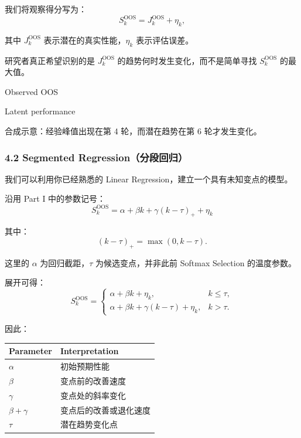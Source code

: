 我们将观察得分写为：
\[S_k^{\mathrm{OOS}}
=
J_k^{\mathrm{OOS}}+\eta_k,\]

其中 \(J_k^{\mathrm{OOS}}\) 表示潜在的真实性能，\(\eta_k\) 表示评估误差。

研究者真正希望识别的是 \(J_k^{\mathrm{OOS}}\) 的趋势何时发生变化，而不是简单寻找 \(S_k^{\mathrm{OOS}}\) 的最大值。


Observed OOS

Latent performance

合成示意：经验峰值出现在第 4 轮，而潜在趋势在第 6 轮才发生变化。

\hypertarget{part-3-48-0001-segmented-regressionux5206ux6bb5ux56deux5f52}{%
\subsubsection{4.2 Segmented Regression（分段回归）}\label{part-3-48-0001-segmented-regressionux5206ux6bb5ux56deux5f52}}

我们可以利用你已经熟悉的 Linear Regression，建立一个具有未知变点的模型。

沿用 Part I 中的参数记号：
\[\boxed{
S_k^{\mathrm{OOS}}
=
\alpha+\beta k
+\gamma(k-\tau)_+
+\eta_k
}\]

其中：
\[(k-\tau)_+=\max(0,k-\tau).\]

这里的 \(\alpha\) 为回归截距，\(\tau\) 为候选变点，并非此前 Softmax Selection 的温度参数。

展开可得：
\[S_k^{\mathrm{OOS}}
=
\begin{cases}
\alpha+\beta k+\eta_k,
&k\leq\tau,\\
\alpha+\beta k+\gamma(k-\tau)+\eta_k,
&k>\tau.
\end{cases}\]

因此：

\begin{readertable}
\begin{longtable}[]{@{}
  >{\raggedright\arraybackslash}p{}
  >{\raggedright\arraybackslash}p{}@{}}
\toprule
Parameter & Interpretation \\
\midrule
\endhead
\(\alpha\) & 初始预期性能 \\
\(\beta\) & 变点前的改善速度 \\
\(\gamma\) & 变点处的斜率变化 \\
\(\beta+\gamma\) & 变点后的改善或退化速度 \\
\(\tau\) & 潜在趋势变化点 \\
\bottomrule
\end{longtable}
\end{readertable}

